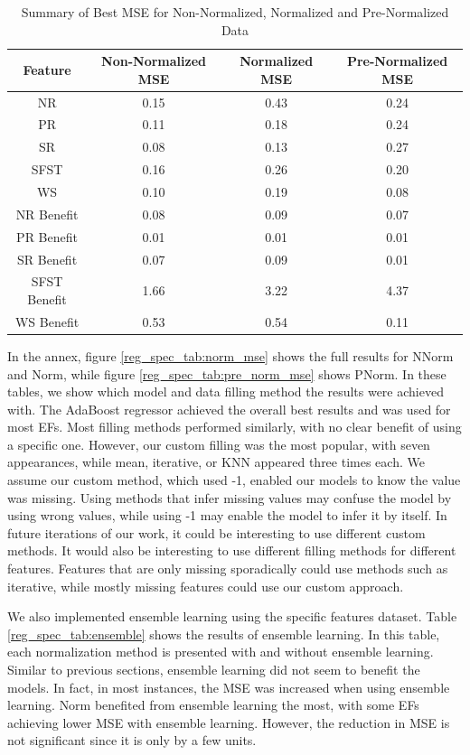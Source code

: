 \documentclass[12pt,letterpaper]{article}
\begin{document}
\begin{table}[H]
\centering
\begin{tabular}{|c|c|c|c|}
\hline
\textbf{Feature} & \textbf{Non-Normalized MSE} & \textbf{Normalized MSE} & \textbf{Pre-Normalized MSE} \\
\hline
NR & 0.15 & 0.43 & 0.24 \\
\hline
PR & 0.11 & 0.18 & 0.24 \\
\hline
SR & 0.08 & 0.13 & 0.27 \\
\hline
SFST & 0.16 & 0.26 & 0.20 \\
\hline
WS & 0.10 & 0.19 & 0.08 \\
\hline
NR Benefit & 0.08 & 0.09 & 0.07 \\
\hline
PR Benefit & 0.01 & 0.01 & 0.01 \\
\hline
SR Benefit & 0.07 & 0.09 & 0.01 \\
\hline
SFST Benefit & 1.66 & 3.22 & 4.37 \\
\hline
WS Benefit & 0.53 & 0.54 & 0.11 \\
\hline
\end{tabular}
\caption{Summary of Best MSE for Non-Normalized, Normalized and Pre-Normalized Data}
\label{reg_spec_tab:mse_summary}
\end{table}

In the annex, figure \ref{reg_spec_tab:norm_mse} shows the full results for \ac{NNorm} and \ac{Norm}, while figure \ref{reg_spec_tab:pre_norm_mse} shows \ac{PNorm}.
In these tables, we show which model and data filling method the results were achieved with.
The AdaBoost regressor achieved the overall best results and was used for most \ac{EF}s.
Most filling methods performed similarly, with no clear benefit of using a specific one.
However, our custom filling was the most popular, with seven appearances, while mean, iterative, or KNN appeared three times each.
We assume our custom method, which used -1, enabled our models to know the value was missing.
Using methods that infer missing values may confuse the model by using wrong values, while using -1 may enable the model to infer it by itself.
In future iterations of our work, it could be interesting to use different custom methods.
It would also be interesting to use different filling methods for different features.
Features that are only missing sporadically could use methods such as iterative, while mostly missing features could use our custom approach.

We also implemented ensemble learning using the specific features dataset.
Table \ref{reg_spec_tab:ensemble} shows the results of ensemble learning.
In this table, each normalization method is presented with and without ensemble learning.
Similar to previous sections, ensemble learning did not seem to benefit the models.
In fact, in most instances, the MSE was increased when using ensemble learning.
\ac{Norm} benefited from ensemble learning the most, with some \ac{EF}s achieving lower MSE with ensemble learning.
However, the reduction in MSE is not significant since it is only by a few units.
\end{document}
